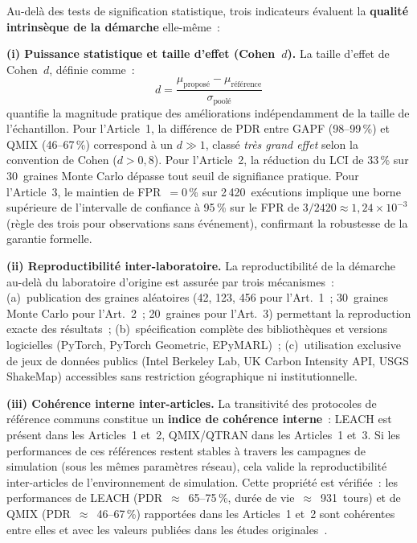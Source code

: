 Au-delà des tests de signification statistique, trois indicateurs évaluent la \textbf{qualité intrinsèque de la démarche} elle-même~:

\noindent\textbf{(i) Puissance statistique et taille d'effet (Cohen~$d$).}
La taille d'effet de Cohen~$d$, définie comme~:
\begin{equation}
d = \frac{\mu_{\text{proposé}} - \mu_{\text{référence}}}{\sigma_{\text{poolé}}}
\label{eq:cohen-d}
\end{equation}
quantifie la magnitude pratique des améliorations indépendamment de la taille de l'échantillon. Pour l'Article~1, la différence de PDR entre GAPF (98--99\,\%) et QMIX (46--67\,\%) correspond à un $d \gg 1$, classé \emph{très grand effet} selon la convention de Cohen ($d > 0{,}8$). Pour l'Article~2, la réduction du LCI de 33\,\% sur 30~graines Monte Carlo dépasse tout seuil de signifiance pratique. Pour l'Article~3, le maintien de FPR~$= 0$\,\% sur 2\,420~exécutions implique une borne supérieure de l'intervalle de confiance à 95\,\% sur le FPR de $3/2420 \approx 1{,}24 \times 10^{-3}$ (règle des trois pour observations sans événement), confirmant la robustesse de la garantie formelle.

\noindent\textbf{(ii) Reproductibilité inter-laboratoire.}
La reproductibilité de la démarche au-delà du laboratoire d'origine est assurée par trois mécanismes~: (a)~publication des graines aléatoires (42, 123, 456 pour l'Art.~1~; 30~graines Monte Carlo pour l'Art.~2~; 20~graines pour l'Art.~3) permettant la reproduction exacte des résultats~; (b)~spécification complète des bibliothèques et versions logicielles (PyTorch, PyTorch Geometric, EPyMARL)~; (c)~utilisation exclusive de jeux de données publics (Intel Berkeley Lab, UK Carbon Intensity API, USGS ShakeMap) accessibles sans restriction géographique ni institutionnelle.

\noindent\textbf{(iii) Cohérence interne inter-articles.}
La transitivité des protocoles de référence communs constitue un \textbf{indice de cohérence interne}~: LEACH est présent dans les Articles~1 et~2, QMIX/QTRAN dans les Articles~1 et~3. Si les performances de ces références restent stables à travers les campagnes de simulation (sous les mêmes paramètres réseau), cela valide la reproductibilité inter-articles de l'environnement de simulation. Cette propriété est vérifiée~: les performances de LEACH (PDR~$\approx$~65--75\,\%, durée de vie~$\approx$~931~tours) et de QMIX (PDR~$\approx$~46--67\,\%) rapportées dans les Articles~1 et~2 sont cohérentes entre elles et avec les valeurs publiées dans les études originales~\cite{heinzelman2000leach, rashid2018qmix}.


